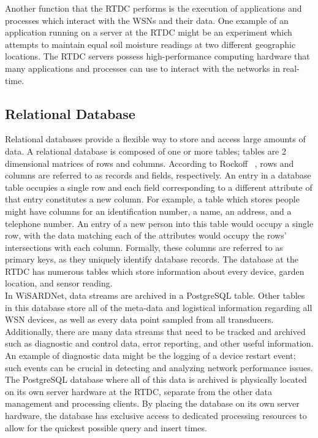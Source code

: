 Another function that the RTDC performs is the execution of applications and processes which interact with the WSNs and their data. One example of an application running on a server at the RTDC might be an experiment which attempts to maintain equal soil moisture readings at two different geographic locations. The RTDC servers possess high-performance computing hardware that many applications and processes can use to interact  with the networks in real-time.\\

\subsection{Relational Database}
Relational databases provide a flexible way to store and access large amounts of data. A relational database is composed of one or more tables; tables are 2 dimensional matrices of rows and columns. According to Rockoff ~\cite{rockoff2010language}, rows and columns are referred to as records and fields, respectively. An entry in a database table occupies a single row and each field corresponding to a different attribute of that entry constitutes a new column. For example, a table which stores people might have columns for an identification number, a name, an address, and a telephone number. An entry of a new person into this table would occupy a single row, with the data matching each of the attributes would occupy the rows' intersections with each column. Formally, these columns are referred to as primary keys, as they uniquely identify database records. The database at the RTDC has numerous tables which store information about every device, garden location, and sensor reading.\\ 

In WiSARDNet, data streams are archived in a PostgreSQL table. Other tables in this database store all of the meta-data and logistical information regarding all WSN devices, as well as every data point sampled from all transducers. Additionally, there are many data streams that need to be tracked and archived such as diagnostic and control data, error reporting, and other useful information. An example of diagnostic data might be the logging of a device restart event; such events can be crucial in detecting and analyzing network performance issues.\\

The PostgreSQL database where all of this data is archived is physically located on its own server hardware at the RTDC, separate from the other data management and processing clients. By placing the database on its own server hardware, the database has exclusive access to dedicated processing resources to allow for the quickest possible query and insert times.\\ 

